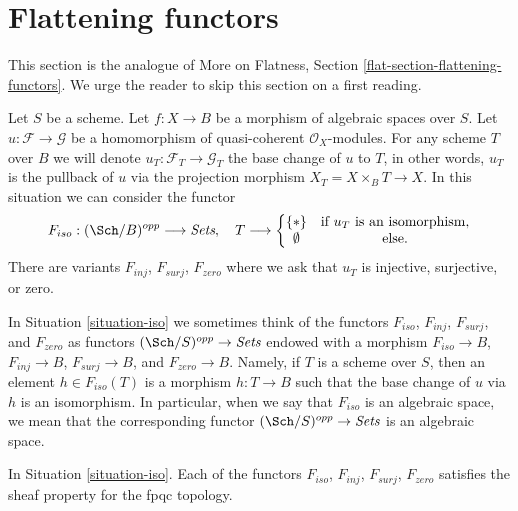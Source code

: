 \section{Flattening functors}
\label{section-F-zero}

\noindent
This section is the analogue of
More on Flatness, Section \ref{flat-section-flattening-functors}.
We urge the reader to skip this section on a first reading.

\begin{situation}
\label{situation-iso}
Let $S$ be a scheme.
Let $f : X \to B$ be a morphism of algebraic spaces over $S$.
Let $u : \mathcal{F} \to \mathcal{G}$ be a homomorphism of
quasi-coherent $\mathcal{O}_X$-modules. For any scheme $T$ over
$B$ we will denote $u_T : \mathcal{F}_T \to \mathcal{G}_T$ the
base change of $u$ to $T$, in other words, $u_T$ is the pullback
of $u$ via the projection morphism $X_T = X \times_B T \to X$.
In this situation we can consider the functor
\begin{equation}
\label{equation-iso}
F_{iso} : (\Sch/B)^{opp} \longrightarrow \textit{Sets}, \quad
T \longrightarrow \left\{
\begin{matrix}
\{*\} & \text{if }u_T\text{ is an isomorphism}, \\
\emptyset & \text{else.}
\end{matrix}
\right.
\end{equation}
There are variants $F_{inj}$, $F_{surj}$, $F_{zero}$ where we ask that
$u_T$ is injective, surjective, or zero.
\end{situation}

\noindent
In Situation \ref{situation-iso} we sometimes think of the functors
$F_{iso}$, $F_{inj}$, $F_{surj}$, and $F_{zero}$ as functors
$(\Sch/S)^{opp} \to \textit{Sets}$ endowed with a morphism
$F_{iso} \to B$, $F_{inj} \to B$, $F_{surj} \to B$, and $F_{zero} \to B$.
Namely, if $T$ is a scheme over $S$, then an element $h \in F_{iso}(T)$
is a morphism $h : T \to B$
such that the base change of $u$ via $h$ is an isomorphism.
In particular, when we say
that $F_{iso}$ is an algebraic space, we mean that the corresponding
functor $(\Sch/S)^{opp} \to \textit{Sets}$ is an algebraic space.

\begin{lemma}
\label{lemma-iso-sheaf}
In Situation \ref{situation-iso}.
Each of the functors $F_{iso}$, $F_{inj}$, $F_{surj}$, $F_{zero}$
satisfies the sheaf property for the fpqc topology.
\end{lemma}

